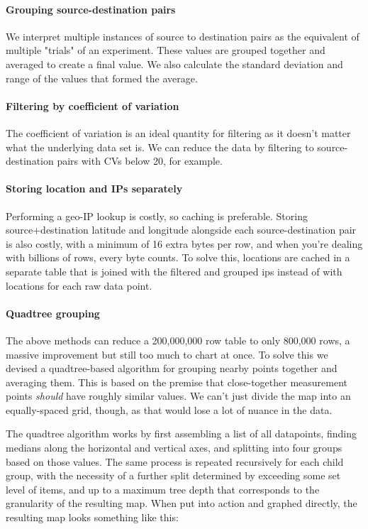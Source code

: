 \documentclass[12pt]{article}
\begin{document}
\paragraph{Grouping source-destination pairs}

We interpret multiple instances of source to destination pairs as the equivalent of multiple "trials" of an experiment. These values are grouped together and averaged to create a final value. We also calculate the standard deviation and range of the values that formed the average.

\paragraph{Filtering by coefficient of variation}

The coefficient of variation is an ideal quantity for filtering as it doesn't matter what the underlying data set is. We can reduce the data by filtering to source-destination pairs with CVs below 20, for example.

\paragraph{Storing location and IPs separately}

Performing a geo-IP lookup is costly, so caching is preferable. Storing source+destination latitude and longitude alongside each source-destination pair is also costly, with a minimum of 16 extra bytes per row, and when you're dealing with billions of rows, every byte counts. To solve this, locations are cached in a separate table that is joined with the filtered and grouped \acrshort{ip}s instead of with locations for each raw data point.

\paragraph{Quadtree grouping}

The above methods can reduce a \textapprox{}200,000,000 row table to only \textapprox{}800,000 rows, a massive improvement but still too much to chart at once. To solve this we devised a quadtree-based algorithm for grouping nearby points together and averaging them. This is based on the premise that close-together measurement points \textit{should} have roughly similar values. We can't just divide the map into an equally-spaced grid, though, as that would lose a lot of nuance in the data.

The quadtree algorithm works by first assembling a list of all datapoints, finding medians along the horizontal and vertical axes, and splitting into four groups based on those values. The same process is repeated recursively for each child group, with the necessity of a further split determined by exceeding some set level of items, and up to a maximum tree depth that corresponds to the granularity of the resulting map. When put into action and graphed directly, the resulting map looks something like this:
\end{document}
